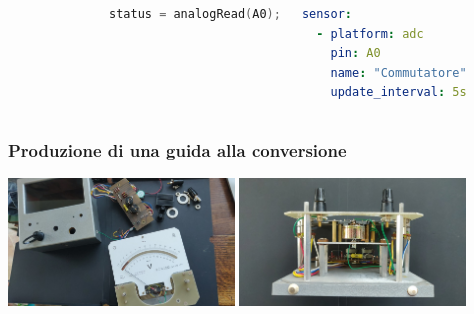 \documentclass[aspectratio=169]{beamer}
\begin{document}
\begin{frame}
\begin{columns}
\begin{figure}[h]
\end{figure}

\begin{lstlisting}[language=cpp]
status = analogRead(A0);
\end{lstlisting}

\begin{lstlisting}[language=yaml]
sensor:
  - platform: adc
    pin: A0
    name: "Commutatore"
    update_interval: 5s
\end{lstlisting}
\end{columns}

\end{frame} 


\begin{frame}
\frametitle{Produzione di una guida alla conversione}
\centering
\includegraphics[width=0.45\textwidth]{strumentosmontato}
\enspace
\includegraphics[width=0.45\textwidth]{strumentosenzascocca}
\end{frame}
\end{document}
